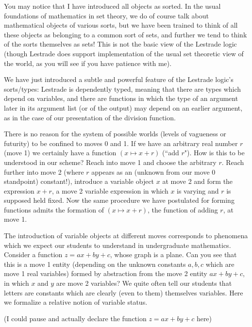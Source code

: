 \documentclass{slides}
\begin{document}
\begin{slide}

You may notice that I have introduced all objects as sorted.  In the usual foundations of mathematics in set theory, we do of course talk about mathematical objects of various sorts,
but we have been trained to think of all these objects as belonging to a common sort of sets, and further we tend to think of the sorts themselves as sets!  This is not the basic view
of the Lestrade logic (though Lestrade does support implementation of the usual set theoretic view of the world, as you will see if you have patience with me).

We have just introduced a subtle and powerful feature of the Lestrade logic's sorts/types:  Lestrade is dependently typed, meaning that there are types which depend on variables,
and there are functions in which the type of an argument later in its argument list (or of the output) may depend on an earlier argument, as in the case of our presentation of the division function.

\end{slide}

\begin{slide}

There is no reason for the system of possible worlds (levels of vagueness or futurity) to be confined to moves 0 and 1.  If we have an arbitrary real number $r$ (move 1)
we certainly have a function $(x \mapsto x + r)$ (``add $r$").  How is this to be understood in our scheme?  Reach into move 1 and choose the arbitrary $r$.
Reach further into move 2 (where $r$ appears as an (unknown from our move 0 standpoint) constant!), introduce a variable object $x$ at move 2  and form the expression $x+r$, a move 2 variable expression in which $x$ is varying and $r$ is supposed
held fixed.  Now the same procedure we have postulated for forming functions admits the formation of $(x \mapsto x + r)$, the function of adding $r$, at move 1.

\end{slide}

\begin{slide}



The introduction of variable objects at different moves corresponds to phenomena which we expect our students to understand in undergraduate mathematics.  Consider a function
$z = ax+by+c$, whose graph is a plane.  Can you see that this is a move 1 entity (depending on the unknown constants $a,b,c$ which are move 1 real variables) formed by abstraction from the move 2 entity $ax+by+c$, in which $x$ and $y$ are move 2 variables?  We quite often tell our students that letters are constants which are clearly (even to them) themselves variables.  Here we formalize a relative notion of variable status.

(I could pause and actually declare the function $z = ax+by+c$ here)

\end{slide}
\end{document}
